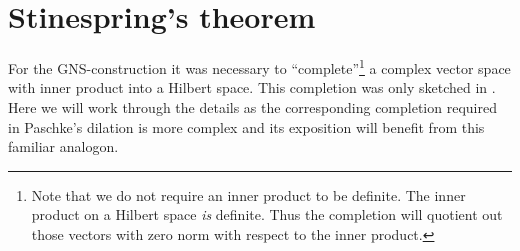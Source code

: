 \documentclass[b]{subfiles}
\begin{document}
\section*{Stinespring's theorem}
\begin{parsec}%
\begin{point}%
For the GNS-construction
it was necessary to ``complete''\footnote{Note that
        we do not require an inner product to be definite.
    The inner product on a Hilbert space \emph{is} definite.
    Thus the completion will quotient out those vectors with
        zero norm with respect to the inner product.}
    a complex vector space with inner product into a Hilbert space.
This completion was only sketched in .
Here we will work through the details
    as the corresponding completion required
    in Paschke's dilation
    is more complex and its exposition will benefit
    from this familiar analogon.
\end{point}


\end{parsec}
\end{document}
